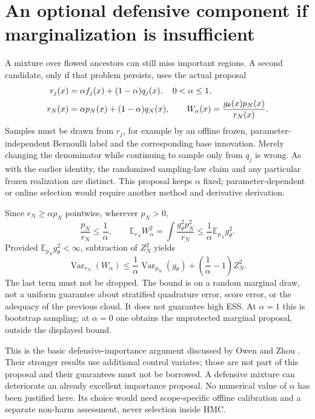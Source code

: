 \documentclass[11pt]{article}
\newcommand{\E}{\mathbb E}
\newcommand{\Var}{\operatorname{Var}}
\begin{document}
\section{An optional defensive component if marginalization is insufficient}

A mixture over flowed ancestors can still miss important regions. A second
candidate, only if that problem persists, uses the actual proposal
\begin{align}
 r_j(x)&=\alpha f_j(x)+(1-\alpha)q_j(x),\quad 0<\alpha\leq1,\notag\\
 r_N(x)&=\alpha p_N(x)+(1-\alpha)q_N(x),\qquad
 W_\alpha(x)=\frac{g_\theta(x)p_N(x)}{r_N(x)} .
 \label{eq:defensive}
\end{align}
Samples must be drawn from $r_j$, for example by an offline frozen,
parameter-independent Bernoulli label and the corresponding base
innovation. Merely changing the denominator while continuing to sample
only from $q_j$ is wrong. As with the earlier identity, the randomized
sampling-law claim and any particular frozen realization are distinct.
This proposal keeps $\alpha$ fixed; parameter-dependent or online
selection would require another method and derivative derivation.

Since $r_N\geq\alpha p_N$ pointwise, wherever $p_N>0$,
\begin{equation}
 \frac{p_N}{r_N}\leq\frac1\alpha,\qquad
 \E_{r_N}W_\alpha^2
 =\int\frac{g_\theta^2 p_N^2}{r_N}
 \leq\frac1\alpha\E_{p_N}g_\theta^2 .
 \label{eq:defensive-bound}
\end{equation}
Provided $\E_{p_N}g_\theta^2<\infty$, subtraction of $Z_N^2$ yields
\begin{equation}
 \Var_{r_N}(W_\alpha)
 \leq\frac1\alpha\Var_{p_N}(g_\theta)
           +\left(\frac1\alpha-1\right)Z_N^2 .
 \label{eq:defensive-variance}
\end{equation}
The last term must not be dropped. The bound is on a random marginal draw,
not a uniform guarantee about stratified quadrature error, score error,
or the adequacy of the previous cloud. It does not guarantee high ESS.
At $\alpha=1$ this is bootstrap sampling; at $\alpha=0$ one obtains the
unprotected marginal proposal, outside the displayed bound.

This is the basic defensive-importance argument discussed by
Owen and Zhou \cite[Sec.~3, especially Eq.~(10), and Sec.~3.1]{owen}.
Their stronger results use additional control variates; those are not
part of this proposal and their guarantees must not be borrowed.
A defensive mixture can deteriorate an already excellent importance
proposal. No numerical value of $\alpha$ has been justified here.
Its choice would need scope-specific offline calibration and a separate
non-harm assessment, never selection inside HMC.
\end{document}
